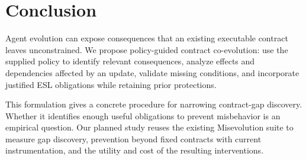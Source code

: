 \section{Conclusion}
Agent evolution can expose consequences that an existing executable contract leaves unconstrained. We propose policy-guided contract co-evolution: use the supplied policy to identify relevant consequences, analyze effects and dependencies affected by an update, validate missing conditions, and incorporate justified ESL obligations while retaining prior protections.

This formulation gives a concrete procedure for narrowing contract-gap discovery. Whether it identifies enough useful obligations to prevent misbehavior is an empirical question. Our planned study reuses the existing Misevolution suite to measure gap discovery, prevention beyond fixed contracts with current instrumentation, and the utility and cost of the resulting interventions.
